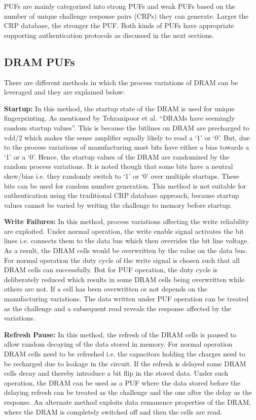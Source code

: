 \documentclass[journal, a4paper]{IEEEtran}
\begin{document}
PUFs are mainly categorized into strong PUFs and weak PUFs based on the number of unique challenge response pairs (CRPs) they can generate. Larger the CRP database, the stronger the PUF. Both kinds of PUFs have appropriate supporting authentication protocols as discussed in the next sections.

\subsection{DRAM PUFs}
There are different methods in which the process variations of DRAM can be leveraged and they are explained below:

\textbf{Startup:} In this method, the startup state of the DRAM is used for unique fingerprinting. As mentioned by Tehranipoor et al. “DRAMs have seemingly random startup values”. This is because the bitlines on DRAM are precharged to vdd/2 which makes the sense amplifier equally likely to read a ‘1’ or ‘0’. But, due to the process variations of manufacturing most bits have either a bias towards a ‘1’ or a ‘0’. Hence, the startup values of the DRAM are randomized by the random process variations. It is noted though that some bits have a neutral skew/bias i.e. they randomly switch to ‘1’ or ‘0’ over multiple startups. These bits can be used for random number generation. This method is not suitable for authentication using the traditional CRP database approach, because startup values cannot be varied by writing the challenge to memory before startup.\cite{TEH15}

\textbf{Write Failures:} In this method, process variations affecting the write reliability are exploited. Under normal operation, the write enable signal activates the bit lines i.e. connects them to the data bus which then overrides the bit line voltage. As a result, the DRAM cells would be overwritten by the value on the data bus. For normal operation the duty cycle of the write signal is chosen such that all DRAM cells can successfully. But for PUF operation, the duty cycle is deliberately reduced which results in some DRAM cells being overwritten while others are not. If a cell has been overwritten or not depends on the manufacturing variations. The data written under PUF operation can be treated as the challenge and a subsequent read reveals the response affected by the variations. \cite{HASH}

\textbf{Refresh Pause:} In this method, the refresh of the DRAM cells is paused to allow random decaying of the data stored in memory. \cite{SUT18} \cite{XIO16} \cite{SCH19} \cite{MISK} For normal operation DRAM cells need to be refreshed i.e. the capacitors holding the charges need to be recharged due to leakage in the circuit. If the refresh is delayed some DRAM cells decay and thereby introduce a bit flip in the stored data. Under such operation, the DRAM can be used as a PUF where the data stored before the delaying refresh can be treated as the challenge and the one after the delay as the response. An alternate method exploits data remanence properties of the DRAM, where the DRAM is completely switched off and then the cells are read. \cite{REM}
\end{document}
